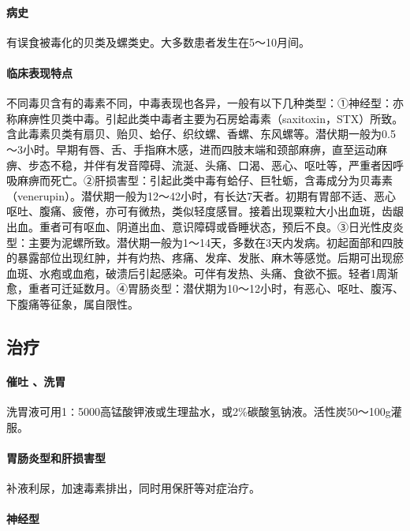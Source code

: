 \paragraph{病史}

有误食被毒化的贝类及螺类史。大多数患者发生在5～10月间。

\paragraph{临床表现特点}

不同毒贝含有的毒素不同，中毒表现也各异，一般有以下几种类型：①神经型：亦称麻痹性贝类中毒。引起此类中毒者主要为石房蛤毒素（saxitoxin，STX）所致。含此毒素贝类有扇贝、贻贝、蛤仔、织纹螺、香螺、东风螺等。潜伏期一般为0.5～3小时。早期有唇、舌、手指麻木感，进而四肢末端和颈部麻痹，直至运动麻痹、步态不稳，并伴有发音障碍、流涎、头痛、口渴、恶心、呕吐等，严重者因呼吸麻痹而死亡。②肝损害型：引起此类中毒有蛤仔、巨牡蛎，含毒成分为贝毒素（venerupin）。潜伏期一般为12～42小时，有长达7天者。初期有胃部不适、恶心呕吐、腹痛、疲倦，亦可有微热，类似轻度感冒。接着出现粟粒大小出血斑，齿龈出血。重者可有呕血、阴道出血、意识障碍或昏睡状态，预后不良。③日光性皮炎型：主要为泥螺所致。潜伏期一般为1～14天，多数在3天内发病。初起面部和四肢的暴露部位出现红肿，并有灼热、疼痛、发痒、发胀、麻木等感觉。后期可出现瘀血斑、水疱或血疱，破溃后引起感染。可伴有发热、头痛、食欲不振。轻者1周渐愈，重者可迁延数月。④胃肠炎型：潜伏期为10～12小时，有恶心、呕吐、腹泻、下腹痛等征象，属自限性。

\subsection{治疗}

\paragraph{催吐 、洗胃}

洗胃液可用1∶5000高锰酸钾液或生理盐水，或2\%碳酸氢钠液。活性炭50～100g灌服。

\paragraph{胃肠炎型和肝损害型}

补液利尿，加速毒素排出，同时用保肝等对症治疗。

\paragraph{神经型}

